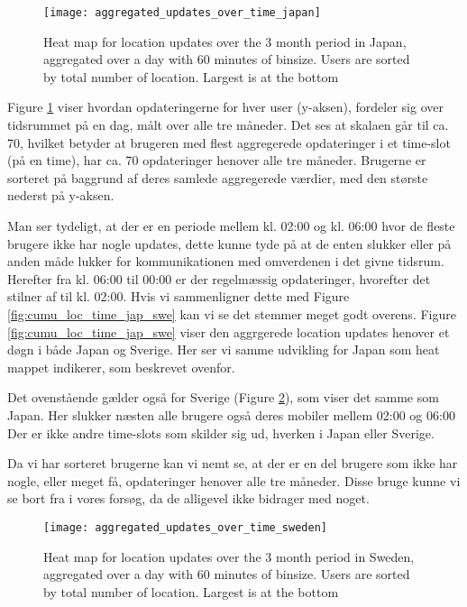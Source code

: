 \begin{figure}[H]
    \hspace*{-0.8cm}
    \centering
    \texttt{[image: aggregated\_updates\_over\_time\_japan]}
    \caption{Heat map for location updates over the 3 month period in Japan, aggregated over a day with 60 minutes of binsize. Users are sorted by total number of location. Largest is at the bottom}
    \label{fig:agg_heatmap_jap}
\end{figure}
Figure \ref{fig:agg_heatmap_jap} viser hvordan opdateringerne for hver user (y-aksen), fordeler sig over tidsrummet på en dag, målt over alle tre måneder. Det ses at skalaen går til ca. 70, hvilket betyder at brugeren med flest aggregerede opdateringer i et time-slot (på en time), har ca. 70 opdateringer henover alle tre måneder. Brugerne er sorteret på baggrund af deres samlede aggregerede værdier, med den største nederst på y-aksen. 

Man ser tydeligt, at der er en periode mellem kl. 02:00 og kl. 06:00 hvor de fleste brugere ikke har nogle updates, dette kunne tyde på at de enten slukker eller på anden måde lukker for kommunikationen med omverdenen i det givne tidsrum. Herefter fra kl. 06:00 til 00:00 er der regelmæssig opdateringer, hvorefter det stilner af til kl. 02:00. Hvis vi sammenligner dette med Figure \ref{fig:cumu_loc_time_jap_swe} kan vi se det stemmer meget godt overens. Figure \ref{fig:cumu_loc_time_jap_swe} viser den aggrgerede location updates henover et døgn i både Japan og Sverige. Her ser vi samme udvikling for Japan som heat mappet indikerer, som beskrevet ovenfor. 

Det ovenstående gælder også for Sverige (Figure \ref{fig:agg_heatmap_swe}), som viser det samme som Japan. Her slukker næsten alle brugere også deres mobiler mellem 02:00 og 06:00
Der er ikke andre time-slots som skilder sig ud, hverken i Japan eller Sverige. 

Da vi har sorteret brugerne kan vi nemt se, at der er en del brugere som ikke har nogle, eller meget få, opdateringer henover alle tre måneder. Disse bruge kunne vi se bort fra i vores forsøg, da de alligevel ikke bidrager med noget. 


\begin{figure}[H]
    \hspace*{-0.8cm}
    \centering
    \texttt{[image: aggregated\_updates\_over\_time\_sweden]}
    \caption{Heat map for location updates over the 3 month period in Sweden, aggregated over a day with 60 minutes of binsize. Users are sorted by total number of location. Largest is at the bottom}
    \label{fig:agg_heatmap_swe}
\end{figure}

